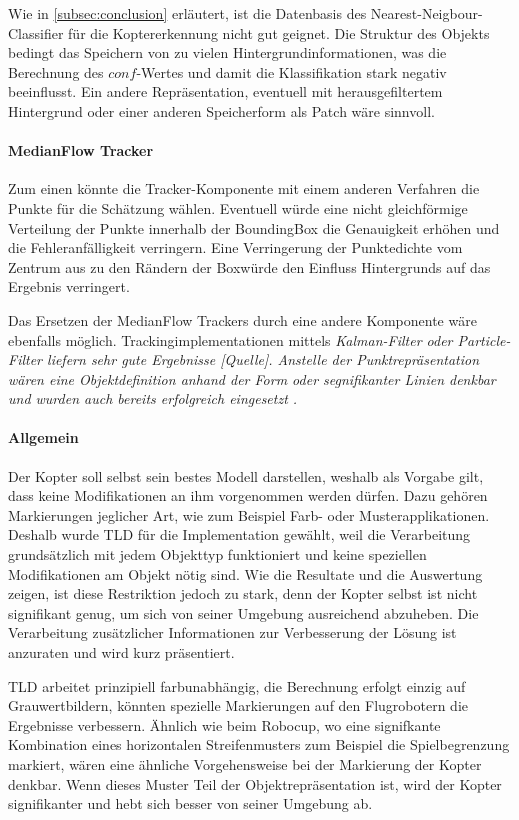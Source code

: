 	Wie in \ref{subsec:conclusion} erläutert, ist die Datenbasis des Nearest-Neigbour-Classifier für die Koptererkennung nicht gut geignet. Die Struktur des Objekts bedingt das Speichern von zu vielen Hintergrundinformationen, was die Berechnung des $conf$-Wertes und damit die Klassifikation stark negativ beeinflusst. Ein andere Repräsentation, eventuell mit herausgefiltertem Hintergrund oder einer anderen Speicherform als Patch wäre sinnvoll.

	\paragraph{MedianFlow Tracker}
		Zum einen könnte die Tracker-Komponente mit einem anderen Verfahren die Punkte für die Schätzung wählen. Eventuell würde eine nicht gleichförmige Verteilung der Punkte innerhalb der BoundingBox die Genauigkeit erhöhen und die Fehleranfälligkeit verringern. Eine Verringerung der Punktedichte vom Zentrum aus zu den Rändern der Boxwürde den Einfluss Hintergrunds auf das Ergebnis verringert.

		Das Ersetzen der MedianFlow Trackers durch eine andere Komponente wäre ebenfalls möglich. Trackingimplementationen mittels \em{Kalman-Filter} \cite{KAF} oder \em{Particle-Filter} \cite{PAF} liefern sehr gute Ergebnisse [Quelle]. Anstelle der Punktrepräsentation wären eine Objektdefinition anhand der Form oder segnifikanter Linien denkbar und wurden auch bereits erfolgreich eingesetzt \cite{AVT}. 

	\paragraph{Allgemein}
		Der Kopter soll selbst sein bestes Modell darstellen, weshalb als Vorgabe gilt, dass keine Modifikationen an ihm vorgenommen werden dürfen. Dazu gehören Markierungen jeglicher Art, wie zum Beispiel Farb- oder Musterapplikationen. Deshalb wurde TLD für die Implementation gewählt, weil die Verarbeitung grundsätzlich mit jedem Objekttyp funktioniert und keine speziellen Modifikationen am Objekt nötig sind. Wie die Resultate und die Auswertung zeigen, ist diese Restriktion jedoch zu stark, denn der Kopter selbst ist nicht signifikant genug, um sich von seiner Umgebung ausreichend abzuheben. Die Verarbeitung zusätzlicher Informationen zur Verbesserung der Lösung ist anzuraten und wird kurz präsentiert.

		TLD arbeitet prinzipiell farbunabhängig, die Berechnung erfolgt einzig auf Grauwertbildern, könnten spezielle Markierungen auf den Flugrobotern die Ergebnisse verbessern. Ähnlich wie beim Robocup, wo eine signifkante Kombination eines horizontalen Streifenmusters zum Beispiel die Spielbegrenzung markiert, wären eine ähnliche Vorgehensweise bei der Markierung der Kopter denkbar. Wenn dieses Muster Teil der Objektrepräsentation ist, wird der Kopter signifikanter und hebt sich besser von seiner Umgebung ab. 

